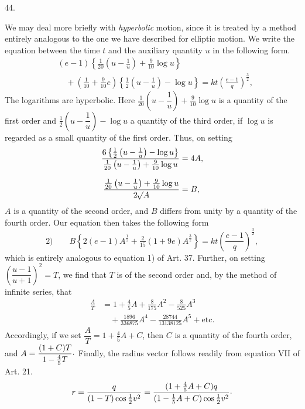 \par{}
\begin{center}
\hypertarget{native-061-article044}{}44.
\end{center}
We may deal more briefly with \emph{hyperbolic} motion, since it is treated by a method entirely analogous to the one we have described for elliptic motion. We write the equation between the time $t$ and the auxiliary quantity $u$ in the following form.
\[
\begin{aligned}
&(e-1)\left\{\tfrac{1}{20}\left(u-\frac{1}{u}\right)+\tfrac{9}{10}\log u\right\}\\
&\quad+\left(\tfrac{1}{10}+\tfrac{9}{10}e\right)\left\{\tfrac{1}{2}\left(u-\frac{1}{u}\right)-\log u\right\}=kt\left(\frac{e-1}{q}\right)^{\frac{3}{2}},
\end{aligned}
\]
\noindent The logarithms are hyperbolic. Here $\tfrac{1}{20}\left(u-\dfrac{1}{u}\right)+\tfrac{9}{10}\log u$ is a quantity of the first order and $\tfrac{1}{2}\left(u-\dfrac{1}{u}\right)-\log u$ a quantity of the third order, if $\log u$ is regarded as a small quantity of the first order. Thus, on setting
\[
\begin{aligned}
\frac{6\left\{\tfrac{1}{2}\left(u-\frac{1}{u}\right)-\log u\right\}}{\tfrac{1}{20}\left(u-\frac{1}{u}\right)+\tfrac{9}{10}\log u}&=4A,\\[.7em]
\frac{\tfrac{1}{20}\left(u-\frac{1}{u}\right)+\tfrac{9}{10}\log u}{2\mathord{{}^{}\!\surd}A}&=B,
\end{aligned}
\]
\noindent{}$A$ is a quantity of the second order, and $B$ differs from unity by a quantity of the fourth order. Our equation then takes the following form
\[
\text{2)}\qquad B\left\{2(e-1)A^{\frac{1}{2}}+\tfrac{2}{15}(1+9e)A^{\frac{3}{2}}\right\}=kt\left(\frac{e-1}{q}\right)^{\frac{3}{2}},
\]
\noindent which is entirely analogous to equation 1) of Art. 37. Further, on setting $\left(\dfrac{u-1}{u+1}\right)^2=T$, we find that $T$ is of the second order and, by the method of infinite series, that
\[
\begin{aligned}
\frac{A}{T}&=1+\tfrac{4}{5}A+\tfrac{8}{175}A^2-\tfrac{8}{525}A^3\\
&\quad+\tfrac{1896}{336875}A^4-\tfrac{28744}{13138125}A^5+\text{etc.}
\end{aligned}
\]
\noindent Accordingly, if we set $\dfrac{A}{T}=1+\tfrac{4}{5}A+C$, then $C$ is a quantity of the fourth order, and $A=\dfrac{(1+C)T}{1-\tfrac{4}{5}T}\mathord{\raisebox{.35ex}{.}}$ Finally, the radius vector follows readily from equation VII of Art. 21.
\[
r=\frac{q}{(1-T)\cos\tfrac{1}{2}v^2}=\frac{(1+\tfrac{4}{5}A+C)q}{(1-\tfrac{1}{5}A+C)\cos\tfrac{1}{2}v^2}\mathord{\raisebox{.35ex}{.}}
\]
